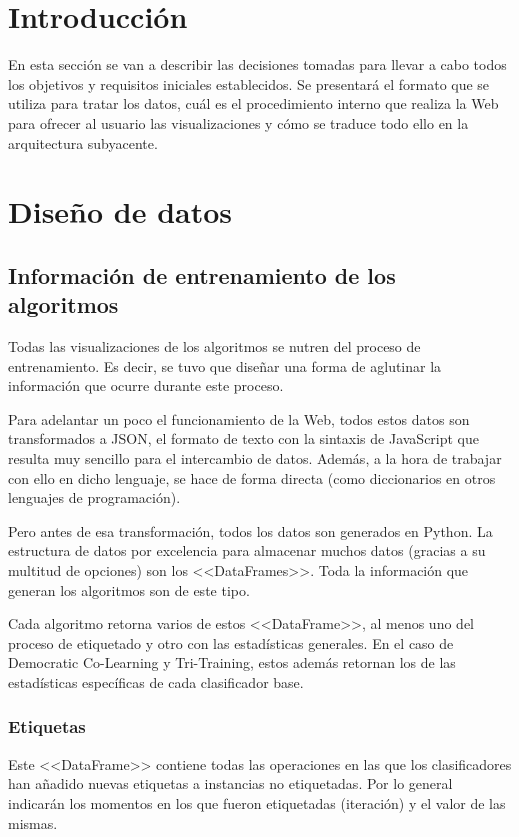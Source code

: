 
\section{Introducción}

En esta sección se van a describir las decisiones tomadas para llevar a cabo
todos los objetivos y requisitos iniciales establecidos. Se presentará el
formato que se utiliza para tratar los datos, cuál es el procedimiento interno
que realiza la Web para ofrecer al usuario las visualizaciones y cómo se traduce
todo ello en la arquitectura subyacente.

\section{Diseño de datos}

\subsection{Información de entrenamiento de los algoritmos}
\label{datos:entrenamiento}
Todas las visualizaciones de los algoritmos se nutren del proceso de
entrenamiento. Es decir, se tuvo que diseñar una forma de aglutinar la
información que ocurre durante este proceso.

Para adelantar un poco el funcionamiento de la Web, todos estos datos son
transformados a JSON, el formato de texto con la sintaxis de JavaScript que
resulta muy sencillo para el intercambio de datos. Además, a la hora de trabajar
con ello en dicho lenguaje, se hace de forma directa (como diccionarios en otros
lenguajes de programación).

Pero antes de esa transformación, todos los datos son generados en Python. La
estructura de datos por excelencia para almacenar muchos datos (gracias a su
multitud de opciones) son los <<DataFrames>>. Toda la información que generan
los algoritmos son de este tipo.

Cada algoritmo retorna varios de estos <<DataFrame>>, al menos uno del proceso
de etiquetado y otro con las estadísticas generales. En el caso de Democratic
Co-Learning y Tri-Training, estos además retornan los de las estadísticas
específicas de cada clasificador base.

\subsubsection{Etiquetas}
Este <<DataFrame>> contiene todas las operaciones en las que los clasificadores
han añadido nuevas etiquetas a instancias no etiquetadas. Por lo general
indicarán los momentos en los que fueron etiquetadas (iteración) y el valor de
las mismas.

